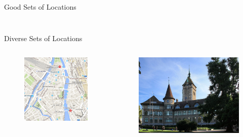 \documentclass{beamer}
\begin{document}
\begin{frame}{Good Sets of Locations}
\begin{columns}
\begin{column}{0.5\textwidth}
\begin{figure}
      \end{figure}
    \end{column}
  \end{columns}
\end{frame}

\begin{frame}{Diverse Sets of Locations}
  \begin{columns}
    \begin{column}{0.5\textwidth}
      \begin{figure}
        \centering
        \includegraphics[width=\textwidth]{diversity_set_2}
      \end{figure}
    \end{column}
    \begin{column}{0.5\textwidth}
      \begin{figure}
        \centering
        \includegraphics[width=.8\textwidth]{landesmuseum}
      \end{figure}
    \end{column}
  \end{columns}
\end{frame}
\end{document}
